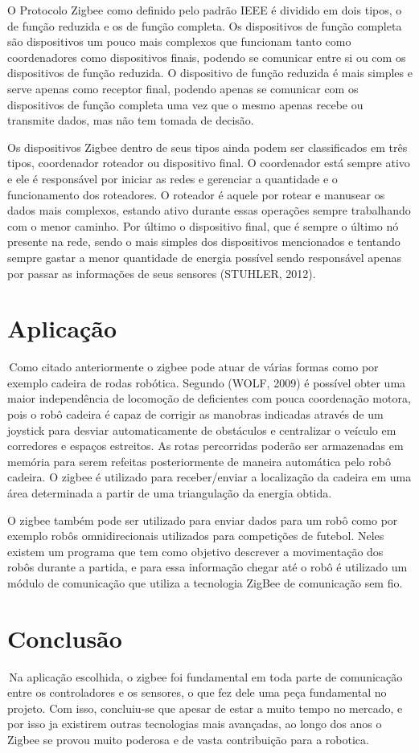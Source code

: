 \documentclass{article}
\begin{document}
O Protocolo Zigbee como definido pelo padrão IEEE é dividido em dois tipos, o de função reduzida e os de função completa. Os dispositivos de função completa são dispositivos um pouco mais complexos que funcionam tanto como coordenadores como dispositivos finais, podendo se comunicar entre si ou com os dispositivos de função reduzida. O dispositivo de função reduzida é mais simples e serve apenas como receptor final, podendo apenas se comunicar com os dispositivos de função completa uma vez que o mesmo apenas recebe ou transmite dados, mas não tem tomada de decisão.

Os dispositivos Zigbee dentro de seus tipos ainda podem ser classificados em três tipos, coordenador roteador ou dispositivo final. O coordenador está sempre ativo e ele é responsável por iniciar as redes e gerenciar a quantidade e o funcionamento dos roteadores. O roteador é aquele por rotear e manusear os dados mais complexos, estando ativo durante essas operações sempre trabalhando com o menor caminho. Por último o dispositivo final, que é sempre o último nó presente na rede, sendo o mais simples dos dispositivos mencionados e tentando sempre gastar a menor quantidade de energia possível sendo responsável apenas por passar as informações de seus sensores (STUHLER, 2012).
\section{Aplicação}
\quad \,Como citado anteriormente o zigbee pode atuar de várias formas como por exemplo cadeira de rodas robótica. Segundo (WOLF, 2009) é possível obter uma maior independência de locomoção de deficientes com pouca coordenação motora, pois o robô cadeira é capaz de corrigir as manobras indicadas através de um joystick para desviar automaticamente de obstáculos e centralizar o veículo em corredores e espaços estreitos. As rotas percorridas poderão ser armazenadas em memória para serem refeitas posteriormente de maneira automática pelo robô cadeira. O zigbee é utilizado para receber/enviar a localização da cadeira em uma área determinada a partir de uma triangulação da energia obtida.

O zigbee também pode ser utilizado para enviar dados para um robô como por exemplo robôs omnidirecionais utilizados para competições de futebol. Neles existem um programa que tem como objetivo descrever a movimentação dos robôs durante a partida, e para essa informação chegar até o robô é utilizado um módulo de comunicação que utiliza a tecnologia ZigBee de comunicação sem fio.
\section{Conclusão}
\quad\,Na aplicação escolhida, o zigbee foi fundamental em toda parte de comunicação entre os controladores e os sensores, o que fez dele uma peça fundamental no projeto. Com isso, concluiu-se que apesar de estar a muito tempo no mercado, e por isso ja existirem outras tecnologias mais avançadas, ao longo dos anos o Zigbee se provou muito poderosa e de vasta contribuição para a robotica.
\newpage
\end{document}

